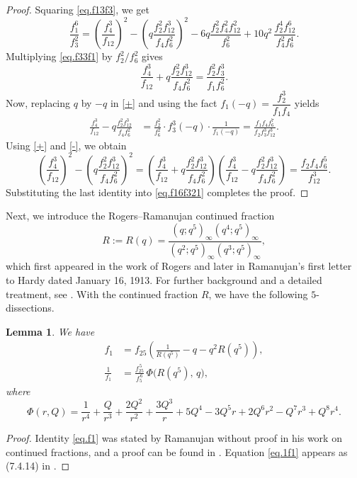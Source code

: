 \documentclass{amsart}
\newtheorem{lemma}[theorem]{Lemma}
\theoremstyle{definition}
\begin{document}
\begin{proof} Squaring \eqref{eq.f13f3}, we get 
\begin{equation}
\label{eq.f16f321}\frac{f_1^{6}}{f_3^{2}}
=\left(\frac{f_4^3}{f_{12}}\right)^2-\left(q\frac{f_2^{2}f_{12}^{3}}{f_4f_6^{2}}\right)^2
-6q\frac{f_2^2f_4^2f_{12}^2}{f_6^2}
+10q^{2}\,\frac{f_2^{4}f_{12}^{6}}{f_4^{2}f_6^{4}}.\end{equation}
Multiplying \eqref{eq.f33f1} by $f_2^2/f_6^2$ gives 
\begin{equation}\label{+}
    \frac{f_4^3}{f_{12}}+q\frac{f_2^{2}f_{12}^{3}}{f_4f_6^{2}}=\frac{f_2^2f_3^3}{f_1f_6^2}.
\end{equation}
Now, replacing $q$ by $-q$ in \eqref{+} and using the fact $f_1(-q)=\dfrac{f_2^3}{f_1 f_4}$ yields
\begin{align}\label{-}
    \frac{f_4^3}{f_{12}}-q\frac{f_2^{2}f_{12}^{3}}{f_4f_6^{2}}&=\frac{f_2^2}{f_6^2}\cdot f_3^3(-q)\cdot \frac{1}{f_1(-q)}=\frac{f_1f_4f_6^{7}}{f_2f_3^{3}f_{12}^{3}}.
\end{align}
Using \eqref{+} and \eqref{-}, we obtain $$\left(\frac{f_4^3}{f_{12}}\right)^2-\left(q\frac{f_2^{2}f_{12}^{3}}{f_4f_6^{2}}\right)^2=\left(\frac{f_4^3}{f_{12}}+q\frac{f_2^{2}f_{12}^{3}}{f_4f_6^{2}}\right)\left(\frac{f_4^3}{f_{12}}-q\frac{f_2^{2}f_{12}^{3}}{f_4f_6^{2}}\right)=\frac{f_2f_4f_6^{5}}{f_{12}^{3}}.$$
Substituting the last identity into \eqref{eq.f16f321} completes the proof.
\end{proof}
Next, we introduce the Rogers--Ramanujan continued fraction
\[
R:=R(q)=\frac{(q;q^5)_\infty(q^4;q^5)_\infty}{(q^2;q^5)_\infty(q^3;q^5)_\infty},
\]
which first appeared in the work of Rogers \cite{Rogers} and later in Ramanujan's first letter to Hardy dated January 16, 1913. For further background and a detailed treatment, see \cite[Chs.~8, 9, 15, 16, and~17]{Hirschhorn}. With the continued fraction $R$, we have the following $5$-dissections.

\begin{lemma}\label{lemma5-disse} We have
\begin{align}
    f_1&=f_{25}\left(\frac{1}{R(q^5)}-q-q^2R(q^5)\right), \label{eq.f1}\\
    \frac{1}{f_1}&=\frac{f_{25}^{\,5}}{f_{5}^{\,6}}\,\Phi\!\bigl(R(q^{5}),\,q\bigr), \label{eq.1f1}
\end{align}
where
\begin{equation*}
\Phi(r,Q)=\frac1{r^{4}}+\frac{Q}{r^{3}}+\frac{2Q^{2}}{r^{2}}+\frac{3Q^{3}}{r}+5Q^{4}
-3Q^{5}r+2Q^{6}r^{2}-Q^{7}r^{3}+Q^{8}r^{4}.
\end{equation*}
\end{lemma}
\begin{proof}
    Identity \eqref{eq.f1} was stated by Ramanujan without proof in his work on continued fractions, and a proof can be found in \cite{Watson}. Equation \eqref{eq.1f1} appears as (7.4.14) in \cite{Berndt_2}.
\end{proof}
\end{document}

